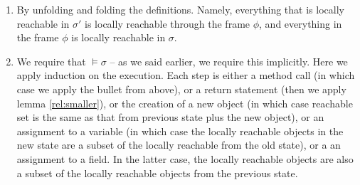  \vspace{1cm}

 
 \begin{enumerate}
\item
By unfolding and folding the definitions. 
Namely, everything that is locally reachable in $\sigma'$ is locally reachable through the frame $\phi$, and everything in the frame $\phi$ is locally reachable in $\sigma$.
  
  \item
 We require that $\models \sigma$ -- as we said earlier, we require this implicitly.
  Here we apply induction on the execution. 
  Each step is either a method call (in which case we apply the bullet from above), or a return statement (then we apply lemma \ref{rel:smaller}), or the creation of a new object (in which case reachable set is the same as that from previous state plus the new object),
  or an assignment to a variable (in which case the locally reachable objects in the new state are a subset of the locally reachable from the old state), or a an assignment to a field. 
  In the latter case, the locally reachable objects are also a subset of the locally reachable objects from the previous state.
  
  
 \end{enumerate}
 

\completeProof
